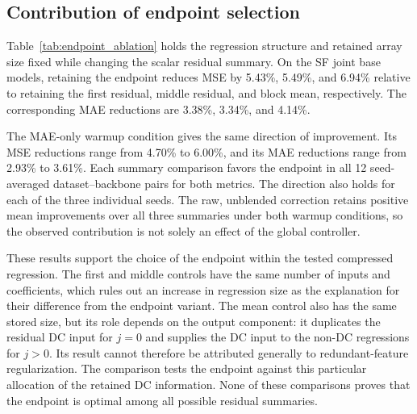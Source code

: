 \begin{table}[!tbp]
\caption{Retained numerical storage before and after the equivalent real representation of ELF. Both counts use the same exclusions. The final column is the mean condition-wise MSE reduction relative to the static base over the 72 legacy/refit conditions. All rows use global blending.}
\label{tab:storage_results}
\centering

\end{table}



\subsection{Contribution of endpoint selection}
Table~\ref{tab:endpoint_ablation} holds the regression structure and retained array size fixed while changing the scalar residual summary. On the SF joint base models, retaining the endpoint reduces MSE by 5.43\%, 5.49\%, and 6.94\% relative to retaining the first residual, middle residual, and block mean, respectively. The corresponding MAE reductions are 3.38\%, 3.34\%, and 4.14\%.

The MAE-only warmup condition gives the same direction of improvement. Its MSE reductions range from 4.70\% to 6.00\%, and its MAE reductions range from 2.93\% to 3.61\%. Each summary comparison favors the endpoint in all 12 seed-averaged dataset--backbone pairs for both metrics. The direction also holds for each of the three individual seeds. The raw, unblended correction retains positive mean improvements over all three summaries under both warmup conditions, so the observed contribution is not solely an effect of the global controller.

These results support the choice of the endpoint within the tested compressed regression. The first and middle controls have the same number of inputs and coefficients, which rules out an increase in regression size as the explanation for their difference from the endpoint variant. The mean control also has the same stored size, but its role depends on the output component: it duplicates the residual DC input for $j=0$ and supplies the DC input to the non-DC regressions for $j>0$. Its result cannot therefore be attributed generally to redundant-feature regularization. The comparison tests the endpoint against this particular allocation of the retained DC information. None of these comparisons proves that the endpoint is optimal among all possible residual summaries.

\begin{table}[!tbp]
\caption{Endpoint selection at equal retained array sizes. Positive values give the mean relative error reduction from retaining the endpoint instead of the listed residual summary. Each comparison uses the same width-64 joint base, regression settings, and global controller. Three-seed losses are averaged within each of 12 dataset--backbone pairs before calculating relative reductions. SF denotes the additional spectral-flatness warmup term.}
\label{tab:endpoint_ablation}
\centering

\end{table}


